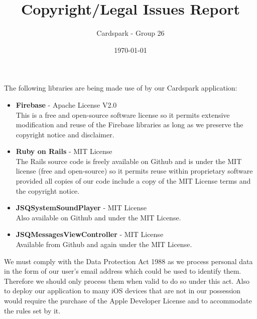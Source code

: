 \documentclass[a4wide, 10pt]{article}
\begin{document}
\title{Copyright/Legal Issues Report}

\author{Cardspark - Group 26}

\date{\today}         %

\maketitle            %

The following libraries are being made use of by our Cardspark application:
\begin{itemize}
	\item \textbf{Firebase} - Apache License V2.0\\
	This is a free and open-source software license so it permits extensive 		modification and reuse of the Firebase libraries as long as we preserve 		the 	copyright notice and disclaimer.
	
	\item \textbf{Ruby on Rails} - MIT License\\
	The Rails source code is freely available on Github and is under the MIT 		license (free and open-source) so it permits reuse within proprietary 		software provided all copies of our code include a copy of the MIT 			License terms and the copyright notice.
	
	\item \textbf{JSQSystemSoundPlayer} - MIT License\\
	Also available on Github and under the MIT License.
	
	\item \textbf{JSQMessagesViewController} - MIT License\\
	Available from Github and again under the MIT License.

\end{itemize}

\vspace{0.8cm}

We must comply with the Data Protection Act 1988 as we process personal data in the form of our user's email address which could be used to identify them.  Therefore we should only process them when valid to do so under this act.  Also to deploy our application to many iOS devices that are not in our possession would require the purchase of the Apple Developer License and to accommodate the rules set by it.
\end{document}
